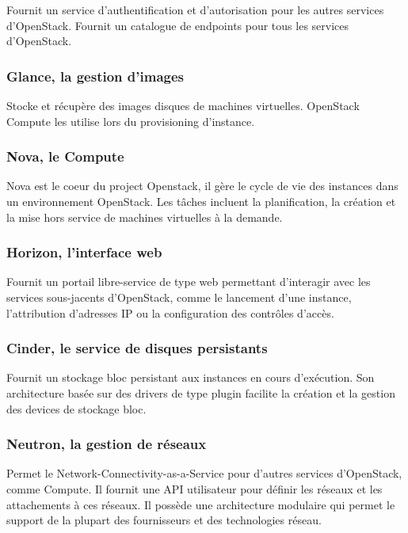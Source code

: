 \documentclass[]{article}
\begin{document}
Fournit un service d'authentification et d'autorisation pour les autres
services d'OpenStack. Fournit un catalogue de endpoints pour tous les
services d'OpenStack.

\subsubsection{Glance, la gestion
d'images}\label{glance-la-gestion-dimages}

Stocke et récupère des images disques de machines virtuelles. OpenStack
Compute les utilise lors du provisioning d'instance.

\subsubsection{Nova, le Compute}\label{nova-le-compute}

Nova est le coeur du project Openstack, il gère le cycle de vie des
instances dans un environnement OpenStack. Les tâches incluent la
planification, la création et la mise hors service de machines
virtuelles à la demande.

\subsubsection{Horizon, l'interface web}\label{horizon-linterface-web}

Fournit un portail libre-service de type web permettant d'interagir avec
les services sous-jacents d'OpenStack, comme le lancement d'une
instance, l'attribution d'adresses IP ou la configuration des contrôles
d'accès.

\subsubsection{Cinder, le service de disques
persistants}\label{cinder-le-service-de-disques-persistants}

Fournit un stockage bloc persistant aux instances en cours d'exécution.
Son architecture basée sur des drivers de type plugin facilite la
création et la gestion des devices de stockage bloc.

\subsubsection{Neutron, la gestion de
réseaux}\label{neutron-la-gestion-de-ruxe9seaux}

Permet le Network-Connectivity-as-a-Service pour d'autres services
d'OpenStack, comme Compute. Il fournit une API utilisateur pour définir
les réseaux et les attachements à ces réseaux. Il possède une
architecture modulaire qui permet le support de la plupart des
fournisseurs et des technologies réseau.
\end{document}
